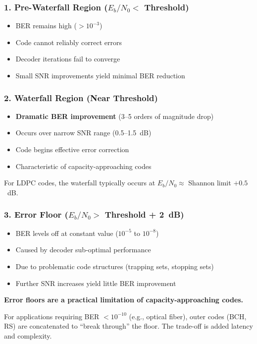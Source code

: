 \subsubsection{1. Pre-Waterfall Region ($E_b/N_0 < $ Threshold)}

\begin{itemize}
\item BER remains high ($>10^{-3}$)
\item Code cannot reliably correct errors
\item Decoder iterations fail to converge
\item Small SNR improvements yield minimal BER reduction
\end{itemize}

\subsubsection{2. Waterfall Region (Near Threshold)}

\begin{itemize}
\item \textbf{Dramatic BER improvement} (3--5 orders of magnitude drop)
\item Occurs over narrow SNR range (0.5--1.5~dB)
\item Code begins effective error correction
\item Characteristic of capacity-approaching codes
\end{itemize}

For LDPC codes, the waterfall typically occurs at $E_b/N_0 \approx $ Shannon limit $+ 0.5$~dB.

\subsubsection{3. Error Floor ($E_b/N_0 > $ Threshold + 2~dB)}

\begin{itemize}
\item BER levels off at constant value ($10^{-5}$ to $10^{-8}$)
\item Caused by decoder sub-optimal performance
\item Due to problematic code structures (trapping sets, stopping sets)
\item Further SNR increases yield little BER improvement
\end{itemize}

\begin{warningbox}
\textbf{Error floors are a practical limitation of capacity-approaching codes.}

For applications requiring BER $< 10^{-10}$ (e.g., optical fiber), outer codes (BCH, RS) are concatenated to ``break through'' the floor. The trade-off is added latency and complexity.
\end{warningbox}

